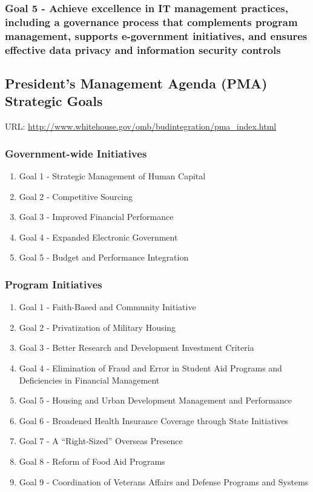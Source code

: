 \documentclass[11pt]{article}
\begin{document}
\subsubsection{Goal 5 - Achieve excellence in IT management practices, including a governance process that complements program management, supports e-government initiatives, and ensures effective data privacy and information security controls}
\label{sec:orge726a59}

\subsection{President’s Management Agenda (PMA) Strategic Goals}
\label{sec:org8b4b20c}
URL: \url{http://www.whitehouse.gov/omb/budintegration/pma\_index.html}
\subsubsection{Government-wide Initiatives}
\label{sec:org28fc47e}
\begin{enumerate}
\item Goal 1 - Strategic Management of Human Capital
\label{sec:org3c16f53}
\item Goal 2 - Competitive Sourcing
\label{sec:org49dc851}
\item Goal 3 - Improved Financial Performance
\label{sec:org588ccf6}
\item Goal 4 - Expanded Electronic Government
\label{sec:org1d3387e}
\item Goal 5 - Budget and Performance Integration
\label{sec:org617cd58}
\end{enumerate}
\subsubsection{Program Initiatives}
\label{sec:orgc8048f0}
\begin{enumerate}
\item Goal 1 - Faith-Based and Community Initiative
\label{sec:orgca425c0}
\item Goal 2 - Privatization of Military Housing
\label{sec:orgc9fd57d}
\item Goal 3 - Better Research and Development Investment Criteria
\label{sec:orgc1fd795}
\item Goal 4 - Elimination of Fraud and Error in Student Aid Programs and Deficiencies in Financial Management
\label{sec:org5b65a47}
\item Goal 5 - Housing and Urban Development Management and Performance
\label{sec:orgb59b8df}
\item Goal 6 - Broadened Health Insurance Coverage through State Initiatives
\label{sec:org469d66c}
\item Goal 7 - A “Right-Sized” Overseas Presence
\label{sec:orgeb152fc}
\item Goal 8 - Reform of Food Aid Programs
\label{sec:orga9e31b1}
\item Goal 9 - Coordination of Veterans Affairs and Defense Programs and Systems
\label{sec:orga001ae6}
\end{enumerate}
\end{document}

